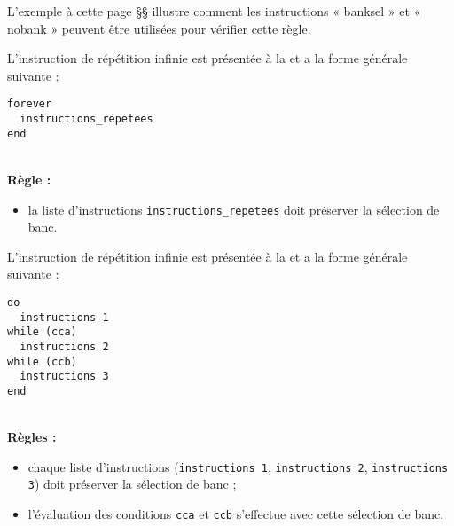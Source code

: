 L’exemple à cette page §§ illustre comment les instructions « banksel » et « nobank » peuvent être utilisées pour vérifier cette règle. 



L'instruction de répétition infinie est présentée à la  et a la forme générale suivante :

\begin{lstlisting}[language=piccolo]
forever
  instructions_repetees
end
\end{lstlisting}

~\\
\textbf{Règle :}
\begin{itemize}
  \item la liste d'instructions \texttt{instructions\_repetees} doit préserver la sélection de banc.
\end{itemize}




L'instruction de répétition infinie est présentée à la  et a la forme générale suivante :

\begin{lstlisting}[language=piccolo]
do
  instructions 1
while (cca)
  instructions 2
while (ccb)
  instructions 3
end
\end{lstlisting}

~\\
\textbf{Règles :}
\begin{itemize}
  \item chaque liste d'instructions (\texttt{instructions 1}, \texttt{instructions 2}, \texttt{instructions 3}) doit préserver la sélection de banc ;
  \item l'évaluation des conditions \texttt{cca} et \texttt{ccb} s'effectue avec cette sélection de banc.
\end{itemize}
